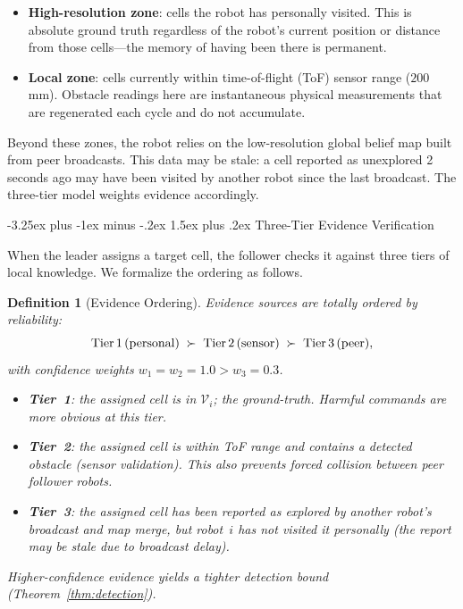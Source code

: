 \documentclass[conference]{IEEEtran}
\makeatletter
\newtheorem{definition}{Definition}
\renewcommand{\subsection}{\@startsection{subsection}{2}{\z@}%
  {-3.25ex plus -1ex minus -.2ex}%
  {1.5ex plus .2ex}%
  {\normalfont\normalsize\itshape\centering}}
\makeatother
\begin{document}
\begin{itemize}
    \item \textbf{High-resolution zone}: cells the robot has personally visited. This is absolute ground truth regardless of the robot's current position or distance from those cells---the memory of having been there is permanent.
    \item \textbf{Local zone}: cells currently within time-of-flight (ToF) sensor range ($200\,$mm). Obstacle readings here are instantaneous physical measurements that are regenerated each cycle and do not accumulate.
\end{itemize}

Beyond these zones, the robot relies on the low-resolution global belief map built from peer broadcasts. This data may be stale: a cell reported as unexplored 2 seconds ago may have been visited by another robot since the last broadcast. The three-tier model weights evidence accordingly.

\subsection{Three-Tier Evidence Verification}
\label{sec:hw_trust}

When the leader assigns a target cell, the follower checks it against three tiers of local knowledge. We formalize the ordering as follows.

\begin{definition}[Evidence Ordering]
\label{def:evidence}
Evidence sources are totally ordered by reliability:
\[
    \text{Tier\,1\,(personal)} \;\succ\;
    \text{Tier\,2\,(sensor)} \;\succ\;
    \text{Tier\,3\,(peer)},
\]
with confidence weights $w_1 = w_2 = 1.0 > w_3 = 0.3$.
\begin{itemize}[nosep]
    \item \textbf{Tier~1}: the assigned cell is in $\mathcal{V}_i$; the ground-truth. Harmful commands are more obvious at this tier.
    \item \textbf{Tier~2}: the assigned cell is within ToF range and contains a detected obstacle (sensor validation). This also prevents forced collision between peer follower robots.
    \item \textbf{Tier~3}: the assigned cell has been reported as explored by another robot's broadcast and map merge, but robot~$i$ has not visited it personally (the report may be stale due to broadcast delay).
\end{itemize}
Higher-confidence evidence yields a tighter detection bound (Theorem~\ref{thm:detection}).
\end{definition}
\end{document}
